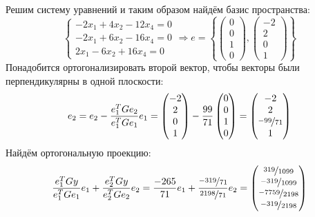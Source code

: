\documentclass{article}
\begin{document}
\begin{center}
    Решим систему уравнений и таким образом найдём базис пространства:
    $$
        \begin{cases}
            -2x_1+4x_2-12x_4 = 0 \\
            -2x_1+6x_2-16x_4 = 0 \\
            2x_1-6x_2+16x_4 = 0
        \end{cases} \Rightarrow e = \left\{\begin{pmatrix}
            0 \\ 0 \\ 1 \\ 0
        \end{pmatrix}, \begin{pmatrix}
            -2 \\ 2 \\ 0 \\ 1
        \end{pmatrix}\right\}
    $$
    Понадобится ортогонализировать второй вектор, чтобы векторы были перпендикулярны в одной плоскости:
    $$e_2 = e_2 - \frac{e_1^{T}Ge_2}{e_1^TGe_1}e_1 = \begin{pmatrix}
        -2 \\ 2 \\ 0 \\ 1
    \end{pmatrix} - \frac{99}{71}\begin{pmatrix}
        0 \\ 0 \\ 1 \\ 0
    \end{pmatrix} = \begin{pmatrix}
        -2 \\ 2 \\ \nicefrac{-99}{71} \\ 1
    \end{pmatrix}$$
    Найдём ортогональную проекцию:
    $$
        \frac{e_1^{T}Gy}{e_1^TGe_1}e_1 +  \frac{e_2^{T}Gy}{e_2^TGe_2}e_2 = \frac{-265}{71}e_1 + \frac{\nicefrac{-319}{71}}{\nicefrac{2198}{71}}e_2 = \begin{pmatrix}
            \nicefrac{319}{1099} \\ \nicefrac{-319}{1099} \\ \nicefrac{-7759}{2198} \\ \nicefrac{-319}{2198}
        \end{pmatrix}
    $$
\end{center}
\end{document}
